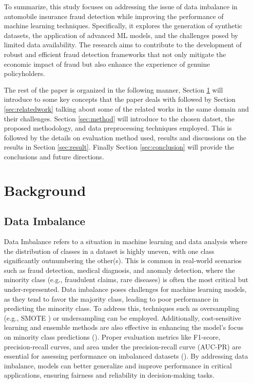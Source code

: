 \documentclass[twoside,11pt]{article}
\begin{document}
\begin{keywords}
To summarize, this study focuses on addressing the issue of data imbalance in automobile insurance fraud detection while improving the performance of machine learning techniques. Specifically, it explores the generation of synthetic datasets, the application of advanced ML models, and the challenges posed by limited data availability. The research aims to contribute to the development of robust and efficient fraud detection frameworks that not only mitigate the economic impact of fraud but also enhance the experience of genuine policyholders.

The rest of the paper is organized in the following manner, Section \ref{sec:background} will introduce to some key concepts that the paper deals with followed by Section \ref{sec:relatedwork} talking about some of the related works in the same domain and their challenges. Section \ref{sec:method} will introduce to the chosen datset, the proposed methodology, and data preprocessing techniques employed. This is followed by the details on evaluation method used, results and discussions on the results in Section \ref{sec:result}. Finally Section \ref{sec:conclusion} will provide the conclusions and future directions.

\section{Background} \label{sec:background}
\subsection{Data Imbalance}
Data Imbalance refers to a situation in machine learning and data analysis where the distribution of classes in a dataset is highly uneven, with one class significantly outnumbering the other(s). This is common in real-world scenarios such as fraud detection, medical diagnosis, and anomaly detection, where the minority class (e.g., fraudulent claims, rare diseases) is often the most critical but under-represented. Data imbalance poses challenges for machine learning models, as they tend to favor the majority class, leading to poor performance in predicting the minority class.
To address this, techniques such as oversampling (e.g., SMOTE \citealp{chawlaSMOTESyntheticMinority2002}) or undersampling can be employed. Additionally, cost-sensitive learning and ensemble methods are also effective in enhancing the model's focus on minority class predictions (\citealp{garcia2009}). Proper evaluation metrics like F1-score, precision-recall curves, and area under the precision-recall curve (AUC-PR) are essential for assessing performance on imbalanced datasets (\citealp{fernandezPerformanceMeasures2018a}).
By addressing data imbalance, models can better generalize and improve performance in critical applications, ensuring fairness and reliability in decision-making tasks.


\end{keywords}
\end{document}
